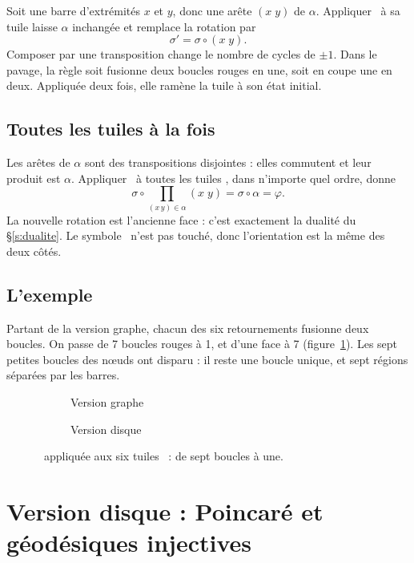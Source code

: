 \documentclass[11pt,a4paper]{article}
\theoremstyle{remark}
\newcommand{\fig}[1]{}
\begin{document}
Soit une barre d'extrémités $x$ et $y$, donc une arête $(x\;y)$ de $\alpha$.
Appliquer \papin\ à sa tuile laisse $\alpha$ inchangée et remplace la rotation
par
\[
  \sigma' = \sigma\circ(x\;y).
\]
Composer par une transposition change le nombre de cycles de $\pm1$. Dans le
pavage, la règle soit fusionne deux boucles rouges en une, soit en coupe une en
deux. Appliquée deux fois, elle ramène la tuile à son état initial.

\subsection{Toutes les tuiles à la fois}

Les arêtes de $\alpha$ sont des transpositions disjointes : elles commutent et
leur produit est $\alpha$. Appliquer \papin\ à toutes les tuiles \CONNECT, dans
n'importe quel ordre, donne
\[
  \sigma\circ\prod_{(x\,y)\in\alpha}(x\;y) = \sigma\circ\alpha = \varphi .
\]
La nouvelle rotation est l'ancienne face : c'est exactement la dualité du
§\ref{s:dualite}. Le symbole \spin\ n'est pas touché, donc l'orientation est la
même des deux côtés.

\subsection{L'exemple}

Partant de la version graphe, chacun des six retournements fusionne deux
boucles. On passe de 7 boucles rouges à 1, et d'une face à 7
(figure~\ref{f:versions}). Les sept petites boucles des nœuds ont disparu : il
reste une boucle unique, et sept régions séparées par les barres.

\begin{figure}[ht]
  \centering
  \begin{subfigure}{.45\textwidth}\centering
    \fig{fig-graphe}\caption{Version graphe}
  \end{subfigure}\hfill
  \begin{subfigure}{.45\textwidth}\centering
    \fig{fig-disque-pavage}\caption{Version disque}
  \end{subfigure}
  \caption{\papin\ appliquée aux six tuiles \CONNECT\ : de sept boucles à une.}
  \label{f:versions}
\end{figure}

\section{Version disque : Poincaré et géodésiques injectives}\label{s:disque}
\end{document}
